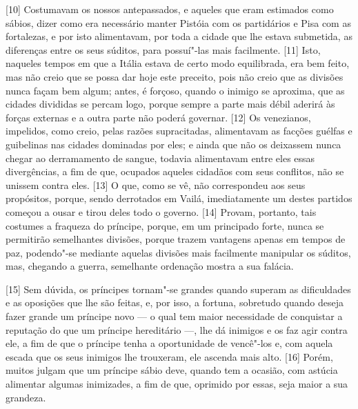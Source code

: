 {[}10{]} Costumavam os nossos antepassados, e aqueles que eram estimados como sábios, dizer como
era necessário manter Pistóia com os partidários e Pisa com as
fortalezas, e por isto alimentavam, por toda a cidade que lhe estava
submetida, as diferenças entre os seus súditos, para possuí"-las mais
facilmente. {[}11{]} Isto, naqueles tempos em que a Itália estava de
certo modo equilibrada,
era bem feito, mas não creio que se possa dar hoje este preceito, pois
não creio que as divisões nunca façam bem algum; antes, é forçoso,
quando o inimigo se aproxima, que as cidades divididas se percam logo,
porque sempre a parte mais débil aderirá às forças externas e a outra
parte não poderá governar. {[}12{]} Os venezianos, impelidos, como
creio, pelas razões supracitadas, alimentavam as facções
guélfas e
guibelinas nas cidades dominadas por eles; e ainda que não os
deixassem nunca chegar ao derramamento de sangue, todavia alimentavam
entre eles essas divergências, a fim de que, ocupados aqueles cidadãos
com seus conflitos, não se unissem contra eles. {[}13{]} O que, como se
vê, não correspondeu aos seus propósitos, porque, sendo derrotados em
Vailá, imediatamente um destes
partidos
começou a ousar e tirou deles todo o governo. {[}14{]} Provam, portanto,
tais costumes a fraqueza do príncipe, porque, em um principado forte,
nunca se permitirão semelhantes divisões, porque trazem vantagens apenas
em tempos de paz, podendo"-se mediante aquelas divisões mais facilmente
manipular os súditos, mas, chegando a guerra, semelhante ordenação
mostra a sua falácia.

{[}15{]} Sem dúvida, os príncipes tornam"-se grandes quando superam as
dificuldades e as oposições que lhe são feitas, e, por isso, a fortuna,
sobretudo quando deseja fazer grande um príncipe novo --- o qual tem
maior necessidade de conquistar a reputação do que um príncipe
hereditário ---, lhe dá inimigos e os faz agir contra ele, a fim de que o
príncipe tenha a oportunidade de vencê"-los e, com aquela escada que os
seus inimigos lhe trouxeram, ele ascenda mais alto. {[}16{]} Porém,
muitos julgam que um príncipe sábio deve, quando tem a ocasião, com
astúcia alimentar algumas inimizades, a fim de que, oprimido por essas,
seja maior a sua grandeza.

